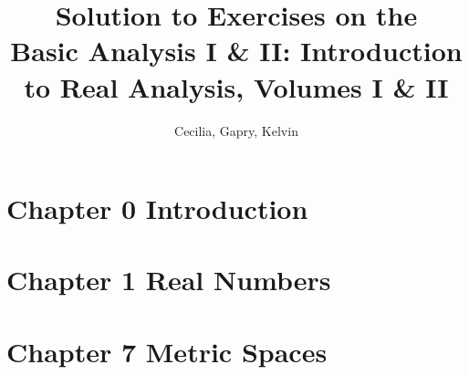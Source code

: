\documentclass{article}
\title{Solution to Exercises on the \\Basic Analysis I \& II: Introduction to Real Analysis, Volumes I \& II}
\author{Cecilia, Gapry, Kelvin}
\begin{document}
\maketitle

\section*{Chapter 0 Introduction}


\section*{Chapter 1 Real Numbers}


\section*{Chapter 7 Metric Spaces}


\end{document}
